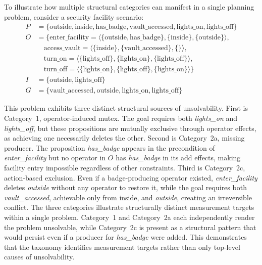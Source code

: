 \begin{example}
    To illustrate how multiple structural categories can manifest in a single planning problem, consider a security facility scenario:
    \begin{align*}
        P & = \{\text{outside}, \text{inside}, \text{has\_badge}, \text{vault\_accessed}, \text{lights\_on}, \text{lights\_off}\}       \\
        O & = \{ \text{enter\_facility} = \langle \{\text{outside}, \text{has\_badge}\}, \{\text{inside}\}, \{\text{outside}\} \rangle, \\
          & \quad \text{access\_vault} = \langle \{\text{inside}\}, \{\text{vault\_accessed}\}, \{\} \rangle,                           \\
          & \quad \text{turn\_on} = \langle \{\text{lights\_off}\}, \{\text{lights\_on}\}, \{\text{lights\_off}\} \rangle,              \\
          & \quad \text{turn\_off} = \langle \{\text{lights\_on}\}, \{\text{lights\_off}\}, \{\text{lights\_on}\} \rangle \}            \\
        I & = \{\text{outside}, \text{lights\_off}\}                                                                                    \\
        G & = \{\text{vault\_accessed}, \text{outside}, \text{lights\_on}, \text{lights\_off}\}
    \end{align*}

    This problem exhibits three distinct structural sources of unsolvability. First is Category~1, operator-induced mutex. The goal requires both \textit{lights\_on} and \textit{lights\_off}, but these propositions are mutually exclusive through operator effects, as achieving one necessarily deletes the other. Second is Category~2a, missing producer. The proposition \textit{has\_badge} appears in the precondition of \textit{enter\_facility} but no operator in $O$ has \textit{has\_badge} in its add effects, making facility entry impossible regardless of other constraints. Third is Category~2c, action-based exclusion. Even if a badge-producing operator existed, \textit{enter\_facility} deletes \textit{outside} without any operator to restore it, while the goal requires both \textit{vault\_accessed}, achievable only from inside, and \textit{outside}, creating an irreversible conflict. The three categories illustrate structurally distinct measurement targets within a single problem. Category~1 and Category~2a each independently render the problem unsolvable, while Category~2c is present as a structural pattern that would persist even if a producer for \textit{has\_badge} were added. This demonstrates that the taxonomy identifies measurement targets rather than only top-level causes of unsolvability.
\end{example}
